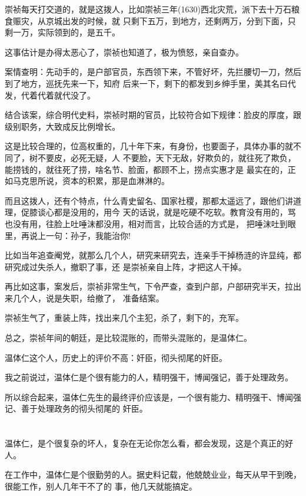 \documentclass[11pt,a4paper,onecolumn]{article}
\begin{document}
崇祯每天打交道的，就是这拨人，比如崇祯三年(1630)西北灾荒，派下去十万石粮食赈灾，从京城出发的时候，就
只剩下五万，到地方，还剩两万，分到下面，只剩一万，实际领到的，是五千。

这事估计是办得太恶心了，崇祯也知道了，极为愤怒，亲自查办。

案情查明：先动手的，是户部官员，东西领下来，不管好坏，先拦腰切一刀，然后到了地方，巡抚先来一下，知府
后来一下，剩下的都发到乡绅手里，美其名曰代发，代着代着就代没了。

结合该案，综合明代史料，崇祯时期的官员，比较符合如下规律：脸皮的厚度，跟级别职务，大致成反比例增长。

这是比较合理的，位高权重的，几十年下来，有身份，也要面子，具体办事的就不同了，树不要皮，必死无疑，人
不要脸，天下无敌，好欺负的，就往死了欺负，能捞钱的，就往死了捞，啥名节、脸面，都顾不上，捞点实惠才是
最实在的，正如马克思所说，资本的积累，那是血淋淋的。

而且这拨人，还有个特点，什么青史留名、国家社稷，那都太遥远了，跟他们讲道理，促膝谈心都是没用的，用今
天的话说，就是吃硬不吃软。教育没有用的，骂也没有用，往脸上吐唾沫都没用，相对而言，比较合适的方式是，
把唾沫吐到眼里，再说上一句：孙子，我能治你!

比如当年追查阉党，就那么几个人，研究来研究去，连亲手干掉杨涟的许显纯，都研究成过失杀人，撤职了事，还
是崇祯亲自上阵，才把这人干掉。

再比如这事，案发后，崇祯非常生气，下令严查，查到户部，户部研究半天，拉出来几个人，说是失职，给撤了，
准备结案。

崇祯生气了，重装上阵，找出来几个主犯，杀了，剩下的，充军。

总之，崇祯年间的朝廷，是比较混账的，而带头混账的，是温体仁。

温体仁这个人，历史上的评价不高：奸臣，彻头彻尾的奸臣。

我之前说过，温体仁是个很有能力的人，精明强干，博闻强记，善于处理政务。

所以综合起来，温体仁先生的最终评价应该是，一个很有能力、精明强干、博闻强记、善于处理政务的彻头彻尾的
奸臣。

\section[\thesection]{}

温体仁，是个很复杂的坏人，复杂在无论你怎么看，都会发现，这是个真正的好人。

在工作中，温体仁是个很勤劳的人。据史料记载，他兢兢业业，每天从早干到晚，很能工作，别人几年干不了的
事，他几天就能搞定。
\end{document}
